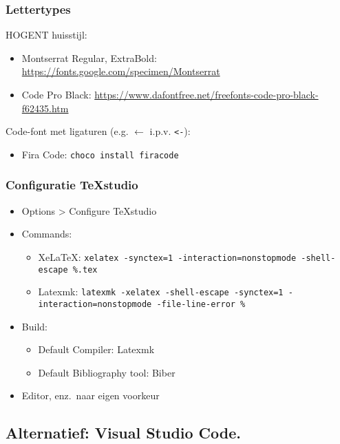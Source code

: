 \documentclass[aspectratio=169]{beamer}
\begin{document}
\begin{frame}[fragile]
  \frametitle{Lettertypes}

  HOGENT huisstijl:

  \begin{itemize}
    \item Montserrat Regular, ExtraBold: \url{https://fonts.google.com/specimen/Montserrat}
    \item Code Pro Black: \url{https://www.dafontfree.net/freefonts-code-pro-black-f62435.htm}
  \end{itemize}

  Code-font met ligaturen (e.g. \({\leftarrow}\) i.p.v. \verb|<-|):

  \begin{itemize}
    \item Fira Code: \texttt{choco install firacode}
  \end{itemize}

\end{frame}

\begin{frame}
  \frametitle{Configuratie TeXstudio}

  \begin{itemize}
    \item Options > Configure TeXstudio
    \item Commands:
      \begin{itemize}
        \item XeLaTeX\@: \texttt{xelatex -synctex=1 -interaction=nonstopmode -shell-escape \%.tex}
        \item Latexmk: \texttt{latexmk -xelatex -shell-escape -synctex=1 -interaction=nonstopmode -file-line-error \%}
      \end{itemize}
    \item Build:
      \begin{itemize}
        \item Default Compiler: Latexmk
        \item Default Bibliography tool: Biber
      \end{itemize}
    \item Editor, enz.\ naar eigen voorkeur
  \end{itemize}

\end{frame}

\subsection{Alternatief: Visual Studio Code.}
\end{document}
